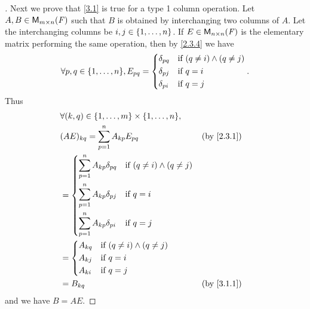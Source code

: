 \begin{proof}[]
  Next we prove that \cref{3.1} is true for a type 1 column operation.
  Let \(A, B \in \ms\) such that \(B\) is obtained by interchanging two columns of \(A\).
  Let the interchanging columns be \(i, j \in \left\lbrace1, \dots, n\right\rbrace\).
  If \(E \in \ms[n][n][\F]\) is the elementary matrix performing the same operation, then by \cref{2.3.4} we have
  \[
    \forall p, q \in \set{1, \dots, n}, E_{p q} = \begin{dcases}
      \delta_{p q} & \text{if } (q \neq i) \land (q \neq j) \\
      \delta_{p j} & \text{if } q = i                       \\
      \delta_{p i} & \text{if } q = j
    \end{dcases}.
  \]
  Thus
  \begin{align*}
     & \forall (k, q) \in \set{1, \dots, m} \times \set{1, \dots, n},                                  \\
     & (AE)_{k q} = \sum_{p = 1}^n A_{k p} E_{p q}                                     &  & \by{2.3.1} \\
     & = \begin{dcases}
           \sum_{p = 1}^n A_{k p} \delta_{p q} & \text{if } (q \neq i) \land (q \neq j) \\
           \sum_{p = 1}^n A_{k p} \delta_{p j} & \text{if } q = i                       \\
           \sum_{p = 1}^n A_{k p} \delta_{p i} & \text{if } q = j
         \end{dcases}                  \\
     & = \begin{dcases}
           A_{k q} & \text{if } (q \neq i) \land (q \neq j) \\
           A_{k j} & \text{if } q = i                       \\
           A_{k i} & \text{if } q = j
         \end{dcases}                                              \\
     & = B_{k q}                                                                       &  & \by{3.1.1}
  \end{align*}
  and we have \(B = AE\).


\end{proof}
